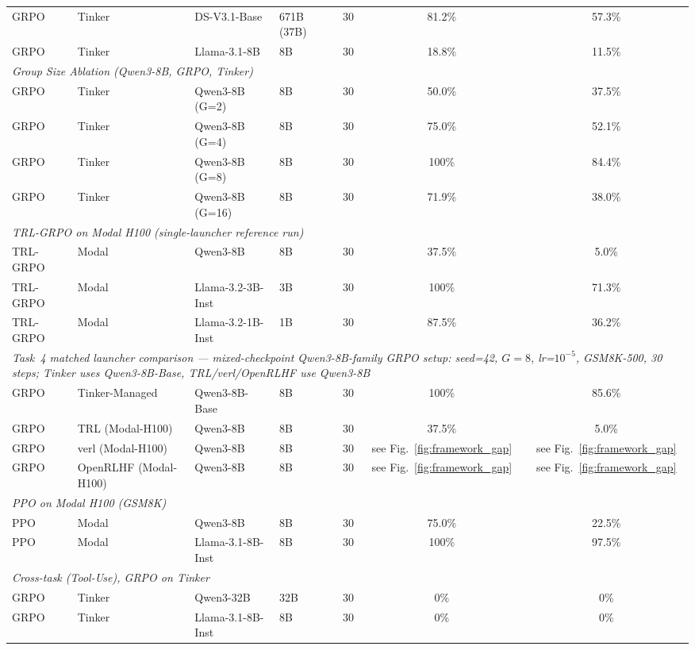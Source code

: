 \documentclass{article}
\begin{document}
\begin{table}[t]
\begin{tabular}{@{}l l l l r c c@{}}
GRPO & Tinker & DS-V3.1-Base & 671B (37B) & 30 & 81.2\% & 57.3\% \\
GRPO & Tinker & Llama-3.1-8B & 8B & 30 & 18.8\% & 11.5\% \\
\midrule
\multicolumn{7}{l}{\textit{Group Size Ablation (Qwen3-8B, GRPO, Tinker)}} \\
\midrule
GRPO & Tinker & Qwen3-8B (G=2) & 8B & 30 & 50.0\% & 37.5\% \\
GRPO & Tinker & Qwen3-8B (G=4) & 8B & 30 & 75.0\% & 52.1\% \\
GRPO & Tinker & Qwen3-8B (G=8) & 8B & 30 & 100\% & 84.4\% \\
GRPO & Tinker & Qwen3-8B (G=16) & 8B & 30 & 71.9\% & 38.0\% \\
\midrule
\multicolumn{7}{l}{\textit{TRL-GRPO on Modal H100 (single-launcher reference run)}} \\
\midrule
TRL-GRPO & Modal & Qwen3-8B & 8B & 30 & 37.5\% & 5.0\% \\
TRL-GRPO & Modal & Llama-3.2-3B-Inst & 3B & 30 & 100\% & 71.3\% \\
TRL-GRPO & Modal & Llama-3.2-1B-Inst & 1B & 30 & 87.5\% & 36.2\% \\
\midrule
\multicolumn{7}{l}{\textit{Task~4 matched launcher comparison --- mixed-checkpoint Qwen3-8B-family GRPO setup: seed=42, $G=8$, lr=$10^{-5}$, GSM8K-500, 30 steps; Tinker uses Qwen3-8B-Base, TRL/verl/OpenRLHF use Qwen3-8B}} \\
\midrule
GRPO & Tinker-Managed & Qwen3-8B-Base & 8B & 30 & 100\% & 85.6\% \\
GRPO & TRL (Modal-H100) & Qwen3-8B & 8B & 30 & 37.5\% & 5.0\% \\
GRPO & verl (Modal-H100) & Qwen3-8B & 8B & 30 & see Fig.~\ref{fig:framework_gap} & see Fig.~\ref{fig:framework_gap} \\
GRPO & OpenRLHF (Modal-H100) & Qwen3-8B & 8B & 30 & see Fig.~\ref{fig:framework_gap} & see Fig.~\ref{fig:framework_gap} \\
\midrule
\multicolumn{7}{l}{\textit{PPO on Modal H100 (GSM8K)}} \\
\midrule
PPO & Modal & Qwen3-8B & 8B & 30 & 75.0\% & 22.5\% \\
PPO & Modal & Llama-3.1-8B-Inst & 8B & 30 & 100\% & 97.5\% \\
\midrule
\multicolumn{7}{l}{\textit{Cross-task (Tool-Use), GRPO on Tinker}} \\
\midrule
GRPO & Tinker & Qwen3-32B & 32B & 30 & 0\% & 0\% \\
GRPO & Tinker & Llama-3.1-8B-Inst & 8B & 30 & 0\% & 0\% \\
\bottomrule
\end{tabular}
\end{table}
\end{document}
